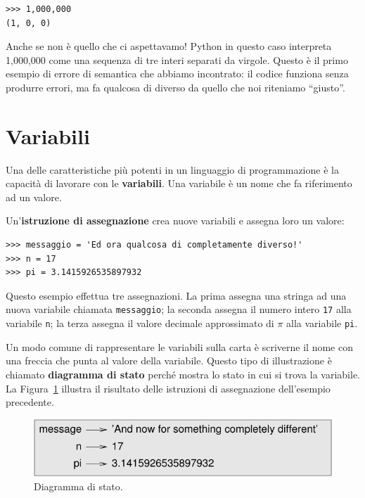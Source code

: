 \documentclass[10pt]{book}
\begin{document}
\begin{verbatim}
>>> 1,000,000
(1, 0, 0)
\end{verbatim}
%
Anche se non è quello che ci aspettavamo! Python in questo caso interpreta 1,000,000 come una sequenza di tre interi separati da virgole. Questo è il primo esempio di errore di semantica che abbiamo incontrato: il codice funziona senza produrre errori, ma fa qualcosa di diverso da quello che noi riteniamo ``giusto''.



\section{Variabili}
\label{variables}

Una delle caratteristiche più potenti in un linguaggio di programmazione è la capacità di lavorare con le {\bf variabili}. Una variabile è un nome che fa riferimento ad un valore.

Un'{\bf istruzione di assegnazione} crea nuove variabili e assegna loro un valore:

\begin{verbatim}
>>> messaggio = 'Ed ora qualcosa di completamente diverso!'
>>> n = 17
>>> pi = 3.1415926535897932
\end{verbatim}
%
Questo esempio effettua tre assegnazioni. La prima assegna una stringa
ad una nuova variabile chiamata {\tt messaggio}; la seconda assegna il numero intero {\tt 17} alla variabile {\tt n}; la terza assegna il valore decimale approssimato di $\pi$ alla variabile {\tt pi}.

Un modo comune di rappresentare le variabili sulla carta è scriverne il nome con una freccia che punta al valore della variabile. Questo tipo di illustrazione è chiamato {\bf diagramma di stato} perché mostra lo stato in cui si trova la variabile. La Figura~\ref{fig.state2} illustra il risultato delle istruzioni di assegnazione dell'esempio precedente.

\begin{figure}
\centerline
{\includegraphics[scale=0.8]{figs/state2.pdf}}
\caption{Diagramma di stato.}
\label{fig.state2}
\end{figure}
\end{document}
